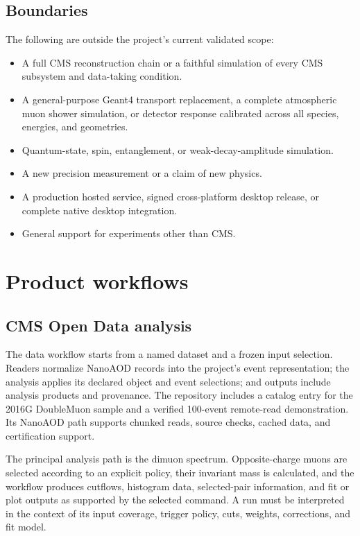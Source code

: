 \documentclass[11pt,a4paper]{article}
\begin{document}
\subsection{Boundaries}

The following are outside the project's current validated scope:

\begin{itemize}
  \item A full CMS reconstruction chain or a faithful simulation of every CMS
  subsystem and data-taking condition.
  \item A general-purpose Geant4 transport replacement, a complete atmospheric
  muon shower simulation, or detector response calibrated across all species,
  energies, and geometries.
  \item Quantum-state, spin, entanglement, or weak-decay-amplitude simulation.
  \item A new precision measurement or a claim of new physics.
  \item A production hosted service, signed cross-platform desktop release, or
  complete native desktop integration.
  \item General support for experiments other than CMS.
\end{itemize}

\section{Product workflows}

\subsection{CMS Open Data analysis}

The data workflow starts from a named dataset and a frozen input selection.
Readers normalize NanoAOD records into the project's event representation;
the analysis applies its declared object and event selections; and outputs
include analysis products and provenance. The repository includes a catalog
entry for the 2016G DoubleMuon sample and a verified 100-event remote-read
demonstration. Its NanoAOD path supports chunked reads, source checks, cached
data, and certification support.

The principal analysis path is the dimuon spectrum. Opposite-charge muons are
selected according to an explicit policy, their invariant mass is calculated,
and the workflow produces cutflows, histogram data, selected-pair information,
and fit or plot outputs as supported by the selected command. A run must be
interpreted in the context of its input coverage, trigger policy, cuts,
weights, corrections, and fit model.
\end{document}

